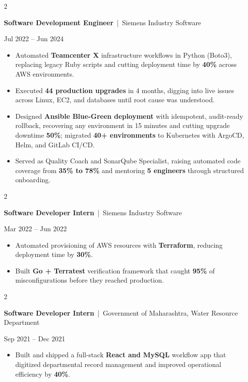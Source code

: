 \documentclass[10pt, letterpaper]{article}
\newenvironment{highlights}{
    \begin{itemize}[
        topsep=0.10 cm,
        parsep=0.06 cm,
        partopsep=0pt,
        itemsep=0.06 cm,
        leftmargin=12pt
    ]
}{
    \end{itemize}
}
\newenvironment{twocolentry}[2][]{
    \onecolentry
    \def\secondColumn{#2}
    \setcolumnwidth{\fill, 4.5 cm}
    \begin{paracol}{2}
}{
    \switchcolumn \raggedleft \secondColumn
    \end{paracol}
    \endonecolentry
}
\begin{document}
\vspace{0.15 cm}

\begin{twocolentry}{Jul 2022 -- Jun 2024}
\textbf{Software Development Engineer} \,|\, Siemens Industry Software
\end{twocolentry}
\begin{highlights}
  \item Automated \textbf{Teamcenter X} infrastructure workflows in Python (Boto3), replacing legacy Ruby scripts and cutting deployment time by \textbf{40\%} across AWS environments.
  \item Executed \textbf{44 production upgrades} in 4 months, digging into live issues across Linux, EC2, and databases until root cause was understood.
  \item Designed \textbf{Ansible Blue-Green deployment} with idempotent, audit-ready rollback, recovering any environment in 15 minutes and cutting upgrade downtime \textbf{50\%}; migrated \textbf{40+ environments} to Kubernetes with ArgoCD, Helm, and GitLab CI/CD.
  \item Served as Quality Coach and SonarQube Specialist, raising automated code coverage from \textbf{35\% to 78\%} and mentoring \textbf{5 engineers} through structured onboarding.
\end{highlights}

\vspace{0.15 cm}

\begin{twocolentry}{Mar 2022 -- Jun 2022}
\textbf{Software Developer Intern} \,|\, Siemens Industry Software
\end{twocolentry}
\begin{highlights}
  \item Automated provisioning of AWS resources with \textbf{Terraform}, reducing deployment time by \textbf{30\%}.
  \item Built \textbf{Go + Terratest} verification framework that caught \textbf{95\%} of misconfigurations before they reached production.
\end{highlights}

\vspace{0.15 cm}

\begin{twocolentry}{Sep 2021 -- Dec 2021}
\textbf{Software Developer Intern} \,|\, Government of Maharashtra, Water Resource Department
\end{twocolentry}
\begin{highlights}
  \item Built and shipped a full-stack \textbf{React and MySQL} workflow app that digitized departmental record management and improved operational efficiency by \textbf{40\%}.
\end{highlights}
\end{document}
